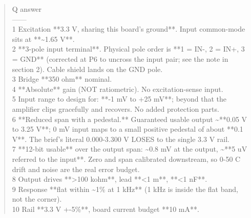 \documentclass[11pt,a4paper]{article}
\begin{document}
\begin{quote}\small\ttfamily\raggedright
\textbar{} Q \textbar{} answer \textbar{}\\
\textbar{}---\textbar{}---\textbar{}\\
\textbar{} 1 \textbar{} Excitation {*}{*}3.3 V, sharing this board's ground{*}{*}. Input common-mode sits at {*}{*}\textasciitilde{}1.65 V{*}{*}. \textbar{}\\
\textbar{} 2 \textbar{} {*}{*}3-pole input terminal{*}{*}. Physical pole order is {*}{*}1 = IN-, 2 = IN+, 3 = GND{*}{*} (corrected at P6 to uncross the input pair; see the note in section 2). Cable shield lands on the GND pole. \textbar{}\\
\textbar{} 3 \textbar{} Bridge {*}{*}350 ohm{*}{*} nominal. \textbar{}\\
\textbar{} 4 \textbar{} {*}{*}Absolute{*}{*} gain (NOT ratiometric). No excitation-sense input. \textbar{}\\
\textbar{} 5 \textbar{} Input range to design for: {*}{*}-1 mV to +25 mV{*}{*}; beyond that the amplifier clips gracefully and recovers. No added protection parts. \textbar{}\\
\textbar{} 6 \textbar{} {*}{*}Reduced span with a pedestal.{*}{*} Guaranteed usable output \textasciitilde{}{*}{*}0.05 V to 3.25 V{*}{*}; 0 mV input maps to a small positive pedestal of about {*}{*}0.1 V{*}{*}. The brief's literal 0.000-3.300 V LOSES to the single 3.3 V rail. \textbar{}\\
\textbar{} 7 \textbar{} {*}{*}12-bit usable{*}{*} over the output span: \textasciitilde{}0.8 mV at the output, \textasciitilde{}{*}{*}5 uV referred to the input{*}{*}. Zero and span calibrated downstream, so 0-50 C drift and noise are the real error budget. \textbar{}\\
\textbar{} 8 \textbar{} Output drives {*}{*}\textgreater{}100 kohm{*}{*}, lead {*}{*}\textless{}1 m{*}{*}, {*}{*}\textless{}1 nF{*}{*}. \textbar{}\\
\textbar{} 9 \textbar{} Response {*}{*}flat within \textasciitilde{}1\% at 1 kHz{*}{*} (1 kHz is inside the flat band, not the corner). \textbar{}\\
\textbar{} 10 \textbar{} Rail {*}{*}3.3 V +-5\%{*}{*}, board current budget {*}{*}10 mA{*}{*}. \textbar{}
\end{quote}
\end{document}
